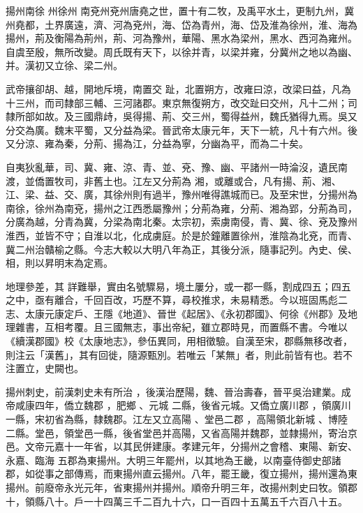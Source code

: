 
\begin{pinyinscope}

 揚州南徐
 州徐州
 南兗州兗州唐堯之世，置十有二牧，及禹平水土，更制九州，冀州堯都，土界廣遠，濟、河為兗州，海、岱為青州，海、岱及淮為徐州，淮、海為揚州，荊及衡陽為荊州，荊、河為豫州，華陽、黑水為梁州，黑水、西河為雍州。自虞至殷，無所改變。周氏既有天下，以徐并青，以梁并雍，分冀州之地以為幽、并。漢初又立徐、梁二州。



 武帝攘卻胡、越，開地斥境，南置交
 趾，北置朔方，改雍曰涼，改梁曰益，凡為十三州，而司隸部三輔、三河諸郡。東京無復朔方，改交趾曰交州，凡十二州；司隸所部如故。及三國鼎歭，吳得揚、荊、交三州，蜀得益州，魏氏猶得九焉。吳又分交為廣。魏末平蜀，又分益為梁。晉武帝太康元年，天下一統，凡十有六州。後又分涼、雍為秦，分荊、揚為江，分益為寧，分幽為平，而為二十矣。



 自夷狄亂華，司、冀、雍、涼、青、並、兗、豫、幽、平諸州一時淪沒，遺民南渡，並僑置牧司，非舊土也。江左又分荊為
 湘，或離或合，凡有揚、荊、湘、江、梁、益、交、廣，其徐州則有過半，豫州唯得譙城而已。及至宋世，分揚州為南徐，徐州為南兗，揚州之江西悉屬豫州；分荊為雍，分荊、湘為郢，分荊為司，分廣為越，分青為冀，分梁為南北秦。太宗初，索虜南侵，青、冀、徐、兗及豫州淮西，並皆不守；自淮以北，化成虜庭。於是於鐘離置徐州，淮陰為北兗，而青、冀二州治贛榆之縣。今志大較以大明八年為正，其後分派，隨事記列。內史、侯、相，則以昇明末為定焉。



 地理參差，其
 詳難舉，實由名號驟易，境土屢分，或一郡一縣，割成四五；四五之中，亟有離合，千回百改，巧歷不算，尋校推求，未易精悉。今以班固馬彪二志、太康元康定戶、王隱《地道》、晉世《起居》、《永初郡國》、何徐《州郡》及地理雜書，互相考覆。且三國無志，事出帝紀，雖立郡時見，而置縣不書。今唯以《續漢郡國》校《太康地志》，參伍異同，用相徵驗。自漢至宋，郡縣無移改者，則注云「漢舊」，其有回徙，隨源甄別。若唯云「某無」者，則此前皆有也。若不注置立，史闕也。


揚州刺史，前漢刺史未有所治
 ，後漢治歷陽，魏、晉治壽春，晉平吳治建業。成帝咸康四年，僑立魏郡
 ，肥鄉
 、元城
 二縣，後省元城。又僑立廣川郡
 ，領廣川一縣，宋初省為縣，隸魏郡。江左又立高陽
 、堂邑二郡
 ，高陽領北新城
 、博陸
 二縣。堂邑，領堂邑一縣，後省堂邑并高陽，又省高陽并魏郡，並隸揚州，寄治京邑。文帝元嘉十一年省，以其民併建康。孝建元年，分揚州之會稽、東陽、新安、永嘉、臨海
 五郡為東揚州。大明三年罷州，以其地為王畿，以南臺侍御史部諸郡，如從事之部傳焉，而東揚州直云揚州。八年，罷王畿，復立揚州，揚州還為東揚州。前廢帝永光元年，省東揚州并揚州。順帝升明三年，改揚州刺史曰牧。領郡十，領縣八十。戶一十四萬三千二百九十六，口一百四十五萬五千六百八十五。




\end{pinyinscope}
